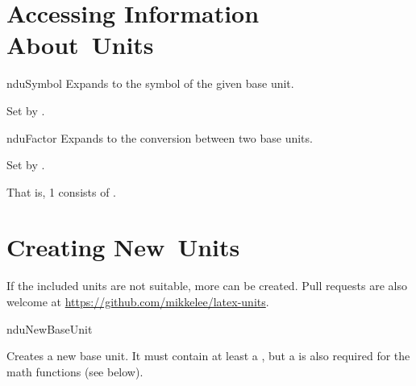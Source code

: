 \documentclass[
	a4paper,
]{article}
\begin{document}
\clearpage
\section{Accessing Information About Units} %

\begin{docCommand}
	{nduSymbol}
	{}
	Expands to the symbol of the given base unit.
	
	Set by .
\end{docCommand}

\begin{docCommand}
	{nduFactor}
	{}
	Expands to the conversion between two base units.

	Set by .
\begin{dispExample}
That is, 1  consists of
 .
\end{dispExample}
\end{docCommand}

\clearpage
\section{Creating New Units} %

\label{units:new}
If the included units are not suitable, more can be created. Pull requests are also welcome at \url{https://github.com/mikkelee/latex-units}.

\begin{docCommand}
	{nduNewBaseUnit}
	{}
	
Creates a new base unit. It must contain at least a , but a  is also required for the math functions (see below).

\end{docCommand}
\end{document}
